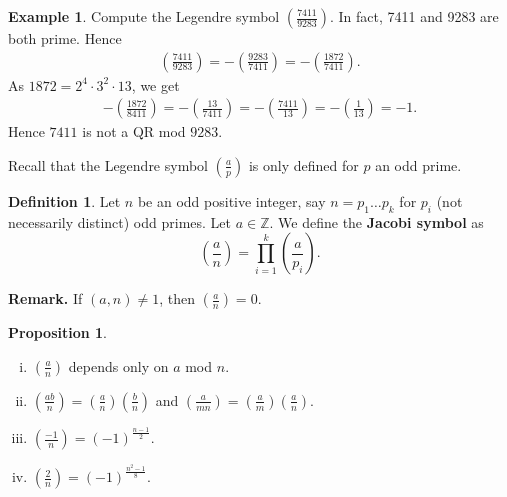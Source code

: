 \documentclass{article}
\theoremstyle{definition}
\newtheorem{prop}[theorem]{Proposition}
\newtheorem{example}{Example}[section]
\newtheorem{defn}{Definition}[section]
\begin{document}
\begin{example}
    Compute the Legendre symbol $\left(\frac{7411}{9283} \right)$. In fact, 7411 and 9283 are both prime. Hence
    \begin{align*}
        \left(\frac{7411}{9283}\right) = -\left(\frac{9283}{7411} \right) = -\left(\frac{1872}{7411} \right).  
    \end{align*}
    As $1872 = 2^4 \cdot 3^2 \cdot 13$, we get
    \begin{align*}
        -\left(\frac{1872}{8411} \right) = -\left(\frac{13}{7411} \right) = - \left(\frac{7411}{13} \right) = -\left(\frac{1}{13} \right) = -1.   
    \end{align*}
    Hence $7411$ is not a QR mod $9283$.
\end{example}
Recall that the Legendre symbol $\left(\frac{a}{p} \right) $ is only defined for $p$ an odd prime.
\begin{defn}
    Let $n$ be an odd positive integer, say $n=p_1\ldots p_k$ for $p_i$ (not necessarily distinct) odd primes. Let $a \in \mathbb{Z}$. We define the \textbf{Jacobi symbol} as \[
    \left(\frac{a}{n} \right) = \prod_{i=1}^{k} \left(\frac{a}{p_i} \right).
    \]
\end{defn}
\textbf{Remark.} If $(a,n)\neq 1$, then $\left(\frac{a}{n} \right)=0$.
\begin{prop}
    \begin{enumerate}[(i)]
        \item $\left(\frac{a}{n} \right) $ depends only on $a$ mod $n$.
        \item $\left(\frac{ab}{n} \right) =\left(\frac{a}{n} \right)\left(\frac{b}{n} \right)$ and $\left(\frac{a}{mn} \right) = \left(\frac{a}{m} \right) \left(\frac{a}{n} \right)$.
        \item $\left(\frac{-1}{n} \right) = (-1)^{\frac{n-1}{2}}$.
        \item $\left(\frac{2}{n} \right) =(-1)^{\frac{n^2-1}{8}}$.
    \end{enumerate}
\end{prop}
\end{document}
